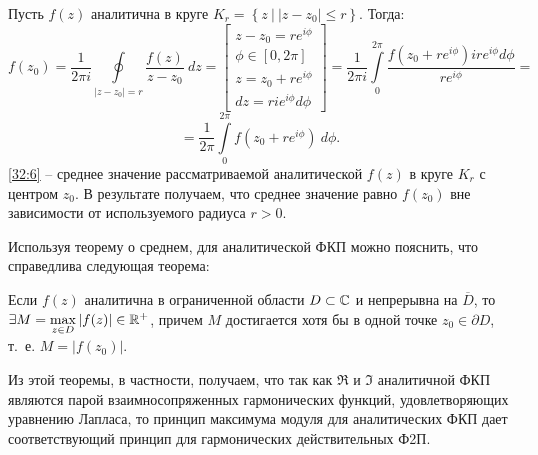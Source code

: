 \documentclass[../../main.tex]{subfiles}
\begin{document}
\begin{corollary*}	
	Пусть $f(z)$ аналитична в круге $K_r = \left\lbrace z \  \big| \ |z-z_0| \le 
	r   \right\rbrace $. Тогда:
	\[   f(z_0) = \frac{1}{2 \pi i} \oint \limits_{|z-z_0| = r} 
	\frac{f(z)}{z-z_0} \ dz = \left[\begin{gathered} z-z_0 = r e^{i\phi} \\
	\phi \in [0,2\pi]  \\
	z = z_0 + r e^{i\phi} \\
	dz = r i e^{i\phi} d \phi
	\end{gathered} \right] = \frac{1}{2 \pi i} \int \limits_{0}^{2\pi} 
	\frac{f(z_0 +r e^{i\phi} ) i r e^{i\phi} d\phi}{r e^{i\phi}}  =     \]
	\begin{equation}
	\label{32:6}
	= \frac{1}{2 \pi } \int \limits_{0}^{2\pi} f(z_0 +r e^{i\phi} ) \ d \phi.
	\end{equation}
	\eqref{32:6} \--- среднее значение рассматриваемой аналитической $f(z)$  
	в круге $K_r$ с 
	центром $z_0$. В результате получаем, что среднее значение 
	равно $f(z_0)$ вне зависимости от используемого радиуса $r>0$.
\end{corollary*}
\begin{remark}
	Используя теорему о среднем, для аналитической ФКП можно пояснить, что 
	справедлива следующая теорема:
\end{remark}
\begin{theorem}
	Если $f(z)$ аналитична в ограниченной области $D \subset \mathbb{C}$ и непрерывна на 
	$\overline{D}$, то $\exists M = \max \limits_{z\in D} |f(z)| \in \mathbb{R}^+$, 
	причем 
	$M$ достигается хотя бы в одной точке $z_0 \in \partial D$, т.~е. $M = 
	|f(z_0)|$.
\end{theorem}		
Из этой теоремы, в частности, получаем, что так как $\Re$ и $\Im$ аналитичной 
ФКП 
являются парой взаимносопряженных гармонических функций, удовлетворяющих 
уравнению Лапласа, то принцип максимума модуля для аналитических ФКП дает 
соответствующий принцип для гармонических действительных Ф2П.
	
\end{document}
